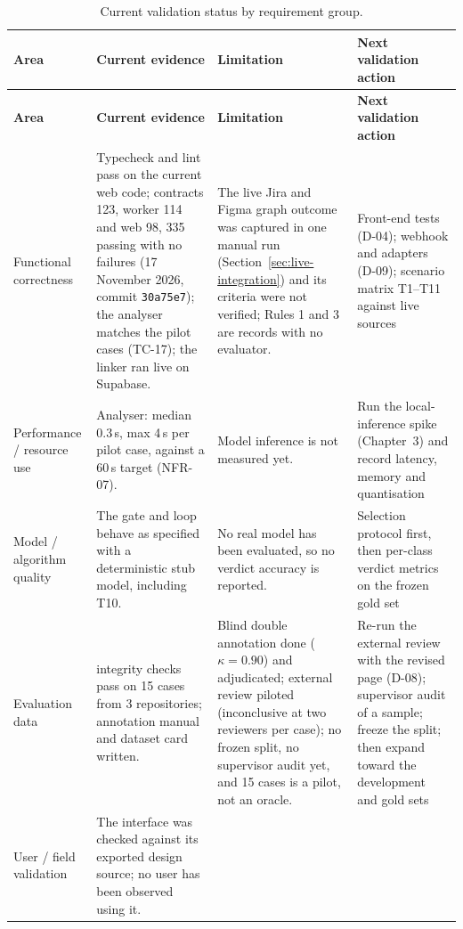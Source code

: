 \begin{longtable}{>{\raggedright\arraybackslash}p{} >{\raggedright\arraybackslash}p{} >{\raggedright\arraybackslash}p{} >{\raggedright\arraybackslash}p{}}
\caption{Current validation status by requirement group.}\label{tab:validation-status}\\
\hline\textbf{Area} & \textbf{Current evidence} & \textbf{Limitation} &
  \textbf{Next validation action} \\
\hline\endfirsthead
\hline\textbf{Area} & \textbf{Current evidence} & \textbf{Limitation} &
  \textbf{Next validation action} \\
\hline\endhead
Functional correctness & Typecheck and lint pass on the current web code;
  contracts 123, worker 114 and web 98, 335 passing with no failures (17
  November 2026, commit \texttt{30a75e7}); the
  analyser matches the pilot cases (TC-17); the linker ran live on Supabase.
  & The live Jira and Figma graph outcome was captured in one manual run
    (Section~\ref{sec:live-integration}) and its criteria were not verified;
    Rules 1 and 3 are records with no evaluator.
  & Front-end tests (D-04); webhook and adapters (D-09); scenario matrix
    T1--T11 against live sources \\
Performance / resource use & Analyser: median 0.3\,s, max 4\,s per pilot
  case, against a 60\,s target (NFR-07).
  & Model inference is not measured yet.
  & Run the local-inference spike (Chapter~3) and record latency, memory and
    quantisation \\
Model / algorithm quality & The gate and loop behave as specified with a
  deterministic stub model, including T10.
  & No real model has been evaluated, so no verdict accuracy is reported.
  & Selection protocol first, then per-class verdict metrics on the frozen gold
    set \\
Evaluation data & 138 integrity checks pass on 15 cases from 3 repositories;
  annotation manual and dataset card written.
  & Blind double annotation done ($\kappa = 0.90$) and adjudicated; external
    review piloted (inconclusive at two reviewers per case); no frozen split,
    no supervisor audit yet, and 15 cases is a pilot, not an oracle.
  & Re-run the external review with the revised page (D-08); supervisor audit
    of a sample; freeze the split; then expand toward the development and gold
    sets \\
User / field validation & The interface was checked against its exported
  design source; no user has been observed using it.

\end{longtable}
